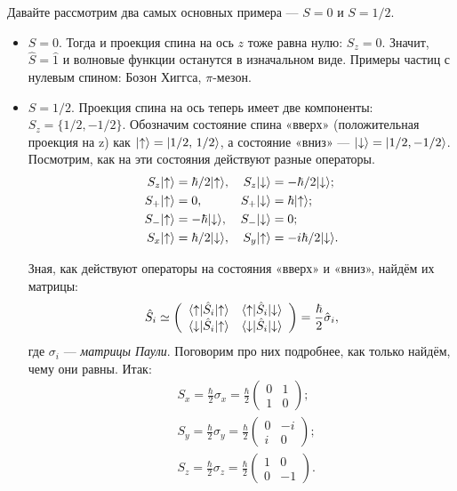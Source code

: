 Давайте рассмотрим два самых основных примера --- $S = 0$ и $S = 1/2$.
\begin{itemize}
  \item $S = 0$. Тогда и проекция спина на ось $z$ тоже равна нулю: $S_z = 0$. Значит,
        $\hat{S} = \hat{1}$ и волновые функции останутся в изначальном виде. Примеры
        частиц с нулевым спином: Бозон Хиггса, $\pi$-мезон.
  \item $S = 1/2$. Проекция спина на ось теперь имеет две компоненты: $S_z = \{1/2,
          -1/2\}$. Обозначим состояние спина «вверх» (положительная проекция на z) как
        $\lvert\uparrow\rangle = \lvert1/2,\, 1/2\rangle$, а состояние «вниз» --- $\lvert\downarrow\rangle =
          \lvert1/2, -1/2\rangle$. Посмотрим, как на эти состояния действуют разные операторы.
        \begin{align*}
          S_z&\lvert\uparrow\rangle = \hbar/2\lvert\uparrow\rangle, & S_z&\lvert\downarrow\rangle = -\hbar/2 \lvert\downarrow\rangle;\\
          S_+&\lvert\uparrow\rangle = 0, & S_+&\lvert\downarrow\rangle = \hbar\lvert\uparrow\rangle;\\
          S_-&\lvert\uparrow\rangle = -\hbar\lvert\downarrow\rangle, & S_-&\lvert\downarrow\rangle = 0;\\
          S_x&\lvert\uparrow\rangle =\hbar/2\lvert\downarrow\rangle, & S_y&\lvert\uparrow\rangle =-i\hbar/2\lvert\downarrow\rangle.
        \end{align*}

        Зная, как действуют операторы на состояния «вверх» и «вниз», найдём их матрицы:
        \[
          \hat{S}_i \simeq \left(\begin{array}{cc}
            \langle\uparrow\rvert\hat{S}_i\lvert\uparrow\rangle & \langle\uparrow\rvert\hat{S}_i\lvert\downarrow\rangle \\
            \langle\downarrow\rvert\hat{S}_i\lvert\uparrow\rangle  & \langle\downarrow\rvert\hat{S}_i\lvert\downarrow\rangle
          \end{array}
          \right) = \frac{\hbar}{2}\hat{\sigma}_i,
        \]
        где $\sigma_i$ --- \textit{матрицы Паули}. Поговорим про них подробнее, как
        только найдём, чему они равны. Итак:
        \begin{align*}
          &S_x = \frac{\hbar}{2}\sigma_x = \frac{\hbar}{2}\left(\begin{array}{cc} 0 & 1\\ 1 & 0 \end{array}\right);\\
          &S_y = \frac{\hbar}{2}\sigma_y = \frac{\hbar}{2}\left(\begin{array}{cc} 0 & -i\\ i & 0 \end{array}\right);\\
          &S_z = \frac{\hbar}{2}\sigma_z = \frac{\hbar}{2}\left(\begin{array}{cc} 1 & 0\\ 0 & -1 \end{array}\right).
        \end{align*}
\end{itemize}

